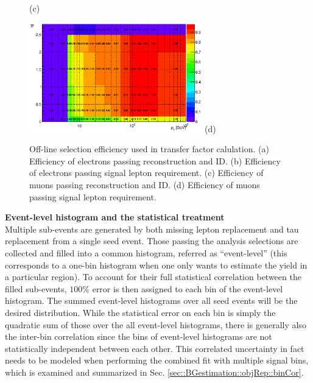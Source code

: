\begin{figure}[htbp]
\begin{center}
\begin{minipage}[t]{.45\textwidth}
      \hspace{10mm} (c)
      \label{fig::BGestimation::objRep::heff_mc_mu_truthToID}
    \end{minipage}
    \begin{minipage}[t]{.45\textwidth}
      \centering
      \includegraphics[width=75mm]{figures/BGestimation/ObjReplacement/method/lepeff/mu_trPtEta_truthToSig.eps}
      \hspace{10mm} (d)
      \label{fig::BGestimation::objRep::heff_mc_mu_truthToSig}
    \end{minipage}
    \caption{Off-line selection efficiency used in transfer factor calulation. (a) Efficiency of electrons passing reconstruction and ID. (b) Efficiency of electrons passing signal lepton requirement.  (c) Efficiency of muons passing reconstruction and ID. (d) Efficiency of muons passing signal lepton requirement.}
    \label{fig::BGestimation::objRep::lep_efficiency}
  \end{center}
\end{figure}


\noindent \textbf{Event-level histogram and the statistical treatment} \\
Multiple sub-events are generated by both missing lepton replacement and tau replacement from a single seed event. Those passing the analysis selections are collected and filled into a common histogram, referred as ``event-level'' (this corresponds to a one-bin histogram when one only wants to estimate the yield in a particular region). To account for their full statistical correlation between the filled sub-events, $100\%$ error is then assigned to each bin of the event-level histogram. 
The summed event-level histograms over all seed events will be the desired distribution. While the statistical error on each bin is simply the quadratic sum of those over the all event-level histograms, there is generally also the inter-bin correlation since the bins of event-level histograms are not statistically independent between each other. This correlated uncertainty in fact needs to be modeled when performing the combined fit with multiple signal bins, which is examined and summarized in Sec. \ref{sec::BGestimation::objRep::binCor}.


